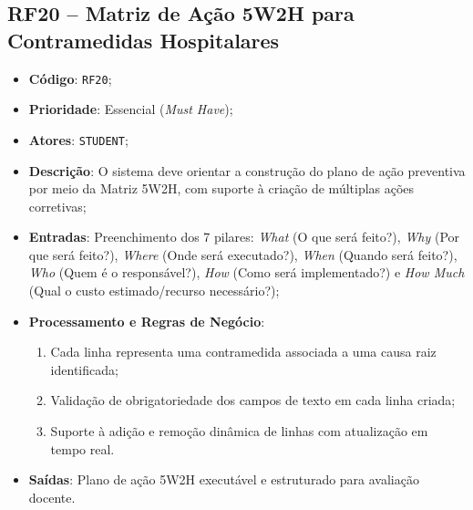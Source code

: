 \subsection{RF20 -- Matriz de Ação 5W2H para Contramedidas Hospitalares}
\begin{itemize}
    \item \textbf{Código}: \texttt{RF20};
    \item \textbf{Prioridade}: Essencial (\textit{Must Have});
    \item \textbf{Atores}: \texttt{STUDENT};
    \item \textbf{Descrição}: O sistema deve orientar a construção do plano de ação preventiva por meio da Matriz 5W2H, com suporte à criação de múltiplas ações corretivas;
    \item \textbf{Entradas}: Preenchimento dos 7 pilares: \textit{What} (O que será feito?), \textit{Why} (Por que será feito?), \textit{Where} (Onde será executado?), \textit{When} (Quando será feito?), \textit{Who} (Quem é o responsável?), \textit{How} (Como será implementado?) e \textit{How Much} (Qual o custo estimado/recurso necessário?);
    \item \textbf{Processamento e Regras de Negócio}:
    \begin{enumerate}
        \item Cada linha representa uma contramedida associada a uma causa raiz identificada;
        \item Validação de obrigatoriedade dos campos de texto em cada linha criada;
        \item Suporte à adição e remoção dinâmica de linhas com atualização em tempo real.
    \end{enumerate}
    \item \textbf{Saídas}: Plano de ação 5W2H executável e estruturado para avaliação docente.
\end{itemize}

